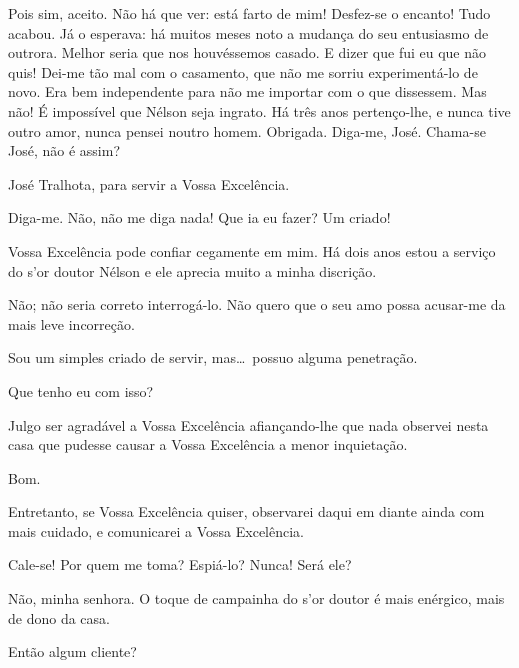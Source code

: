   Pois sim, aceito.  Não há que ver: está farto de
mim! Desfez{}-se o encanto! Tudo acabou. Já o esperava: há muitos meses
noto a mudança do seu entusiasmo de outrora. Melhor seria que nos
houvéssemos casado. E dizer que fui eu que não quis! Dei{}-me tão mal com
o casamento, que não me sorriu experimentá{}-lo de novo. Era bem
independente para não me importar com o que dissessem.
Mas não! É impossível que Nélson seja ingrato. Há três anos
pertenço{}-lhe, e nunca tive outro amor, nunca pensei noutro homem.
Obrigada.  Diga{}-me, José.  Chama{}-se
José, não é assim?

  José Tralhota, para servir a Vossa Excelência.

 Diga{}-me.  Não, não me diga
nada!  Que ia eu fazer? Um criado!

  Vossa Excelência pode confiar cegamente em mim. Há dois anos
estou a serviço do s'or doutor Nélson e ele aprecia
muito a minha discrição.

  Não; não seria correto interrogá{}-lo. Não quero que o seu amo
possa acusar{}-me da mais leve incorreção.

  Sou um simples criado de servir, mas\ldots\ possuo alguma
penetração.

  Que tenho eu com isso?

  Julgo ser agradável a Vossa Excelência afiançando{}-lhe
que nada observei nesta casa que pudesse causar a Vossa Excelência a
menor inquietação.

  Bom.

  Entretanto, se Vossa Excelência quiser, observarei daqui
em diante ainda com mais cuidado, e comunicarei a Vossa Excelência.

  Cale{}-se! Por quem me toma? Espiá{}-lo? Nunca!
 Será ele?

  Não, minha senhora. O toque de campainha do
s'or doutor é mais enérgico, mais de dono da casa.

  Então algum cliente?

